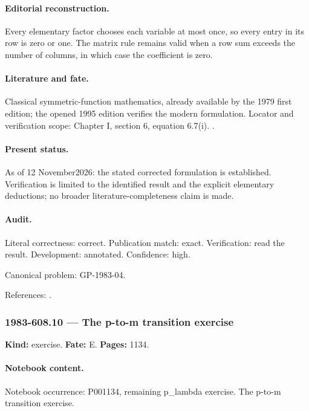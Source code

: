 \paragraph{Editorial reconstruction.} Every elementary factor chooses each variable at most once, so every entry in its row is zero or one. The matrix rule remains valid when a row sum exceeds the number of columns, in which case the coefficient is zero.

\paragraph{Literature and fate.} Classical symmetric-function mathematics, already available by the 1979 first edition; the opened 1995 edition verifies the modern formulation. Locator and verification scope: Chapter I, section 6, equation 6.7(i). \cite{macdonald1995symmetric}.

\paragraph{Present status.} As of 12 November2026: the stated corrected formulation is established. Verification is limited to the identified result and the explicit elementary deductions; no broader literature-completeness claim is made.

\paragraph{Audit.} Literal correctness: correct. Publication match: exact. Verification: read the result. Development: annotated. Confidence: high.

\noindent Canonical problem: GP-1983-04.\par

\noindent References: \citep{macdonald1995symmetric}.\par

\subsubsection{1983-608.10 --- The p-to-m transition exercise}

\label{item:1983-608.10}

\noindent\textbf{Kind:} exercise. \textbf{Fate:} E. \textbf{Pages:} 1134.\par

\paragraph{Notebook content.} Notebook occurrence: P001134, remaining p_lambda exercise. The p-to-m transition exercise.


